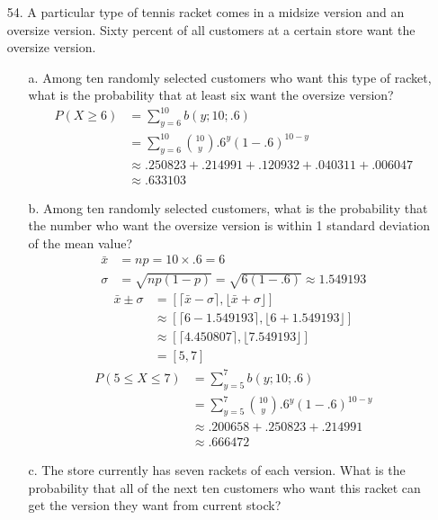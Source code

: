 \documentclass[letterpaper,12pt]{article}
\newcommand{\bp}[3]{%
  \binom{#2}{#1}#3^{#1}(1 - #3)^{#2 - #1}%
}
\begin{document}
\begin{enumerate}
  \item[54.]
    A particular type of tennis racket comes in a midsize version and an oversize version. Sixty percent of all customers at a certain store want the oversize version.
    \begin{enumerate}
      \item[a.]
        Among ten randomly selected customers who want this type of racket, what is the probability that at least six want the oversize version?
        \begin{align*}
          P(X \ge 6) &= \sum_{y = 6}^{10} b(y; 10; .6) \\
          &= \sum_{y = 6}^{10} \bp{y}{10}{.6} \\
          &\approx .250823 + .214991 + .120932 + .040311 + .006047 \\
          &\approx .633103
        \end{align*}
      \item[b.]
        Among ten randomly selected customers, what is the probability that the number who want the oversize version is within 1 standard deviation of the mean value?
        \begin{align*}
          \bar{x} &= np = 10 \times .6 = 6 \\
          \sigma &= \sqrt{np(1 - p)} = \sqrt{6(1 - .6)} \approx 1.549193
        \end{align*}
        \begin{align*}
          \bar{x} \pm \sigma &= [\lceil \bar{x} - \sigma \rceil, \lfloor \bar{x} + \sigma \rfloor] \\
          &\approx [\lceil 6 - 1.549193 \rceil, \lfloor 6 + 1.549193 \rfloor] \\
          &\approx [\lceil 4.450807 \rceil, \lfloor 7.549193 \rfloor] \\
          &= [5, 7]
        \end{align*}
        \begin{align*}
          P(5 \le X \le 7) &= \sum_{y = 5}^7 b(y; 10; .6) \\
          &= \sum_{y = 5}^7 \bp{y}{10}{.6} \\
          &\approx .200658 + .250823 + .214991 \\
          &\approx .666472
        \end{align*}
      \item[c.]
        The store currently has seven rackets of each version. What is the probability that all of the next ten customers who want this racket can get the version they want from current stock?

\end{enumerate}
\end{enumerate}
\end{document}
